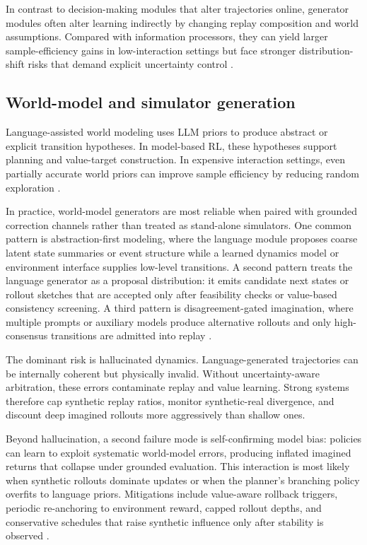 ﻿\documentclass[conference]{IEEEtran}
\begin{document}
In contrast to decision-making modules that alter trajectories online, generator modules often alter learning indirectly by changing replay composition and world assumptions. Compared with information processors, they can yield larger sample-efficiency gains in low-interaction settings but face stronger distribution-shift risks that demand explicit uncertainty control \cite{arxiv_p_2404_03648,arxiv_p_2511_14460,arxiv_p_2602_07848,arxiv_p_2602_14468}.

\subsection{World-model and simulator generation}
Language-assisted world modeling uses LLM priors to produce abstract or explicit transition hypotheses. In model-based RL, these hypotheses support planning and value-target construction. In expensive interaction settings, even partially accurate world priors can improve sample efficiency by reducing random exploration \cite{arxiv_p_2301_12050,arxiv_p_2602_02454,arxiv_p_2602_11075,arxiv_p_2602_12099}.

In practice, world-model generators are most reliable when paired with grounded correction channels rather than treated as stand-alone simulators. One common pattern is abstraction-first modeling, where the language module proposes coarse latent state summaries or event structure while a learned dynamics model or environment interface supplies low-level transitions. A second pattern treats the language generator as a proposal distribution: it emits candidate next states or rollout sketches that are accepted only after feasibility checks or value-based consistency screening. A third pattern is disagreement-gated imagination, where multiple prompts or auxiliary models produce alternative rollouts and only high-consensus transitions are admitted into replay \cite{arxiv_p_2301_12050,arxiv_p_2601_22149,arxiv_p_2602_00785,arxiv_p_2602_02454}.

The dominant risk is hallucinated dynamics. Language-generated trajectories can be internally coherent but physically invalid. Without uncertainty-aware arbitration, these errors contaminate replay and value learning. Strong systems therefore cap synthetic replay ratios, monitor synthetic-real divergence, and discount deep imagined rollouts more aggressively than shallow ones.

Beyond hallucination, a second failure mode is self-confirming model bias: policies can learn to exploit systematic world-model errors, producing inflated imagined returns that collapse under grounded evaluation. This interaction is most likely when synthetic rollouts dominate updates or when the planner's branching policy overfits to language priors. Mitigations include value-aware rollback triggers, periodic re-anchoring to environment reward, capped rollout depths, and conservative schedules that raise synthetic influence only after stability is observed \cite{arxiv_p_2602_02454,arxiv_p_2602_11075,arxiv_p_2602_12099,arxiv_p_2310_20587}.
\end{document}
